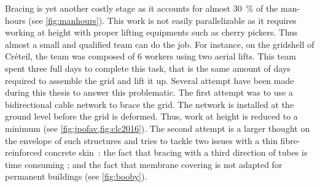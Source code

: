 Bracing is yet another costly stage as it accounts for almost 30~\% of the man-hours (see \cref{fig:manhours}). This work is not easily parallelizable as it requires working at height with proper lifting equipments such as cherry pickers. Thus almost a small and qualified team can do the job. For instance, on the gridshell of Créteil, the team was composed of 6 workers using two aerial lifts. This team spent three full days to complete this task, that is the same amount of days required to assemble the grid and lift it up. Several attempt have been made during this thesis to answer this problematic. The first attempt was to use a bidirectional cable network to brace the grid. The network is installed at the ground level before the grid is deformed. Thus, work at height is reduced to a minimum (see \cref{fig:jpofav,fig:clc2016}). The second attempt is a larger thought on the envelope of such structures and tries to tackle two issues with a thin fibre-reinforced concrete skin~: the fact that bracing with a third direction of tubes is time consuming ; and the fact that membrane covering is not adapted for permanent buildings \cite{Cuvilliers2017} (see \cref{fig:booby}).




